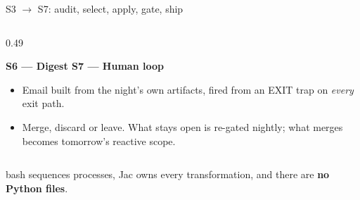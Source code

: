 \documentclass[aspectratio=169,11pt]{beamer}
\newcommand{\srcnote}[1]{\vfill{\scriptsize\color{jsMute}#1}}
\begin{document}
\begin{frame}{S3 $\rightarrow$ S7: audit, select, apply, gate, ship}
\begin{columns}[T]
\begin{column}{0.49\textwidth}
\begin{itemize}
      \end{itemize}
      \textbf{\color{jsPrimary}S6 --- Digest \quad S7 --- Human loop}
      \begin{itemize}
        \item Email built from the night's own artifacts, fired from an EXIT trap on \emph{every} exit path.
        \item Merge, discard or leave. What stays open is re-gated nightly; what merges becomes tomorrow's reactive scope.
      \end{itemize}
    \end{column}
  \end{columns}
  \srcnote{bash sequences processes, Jac owns every transformation, and there are \textbf{no Python files}.}
\end{frame}
\end{document}
